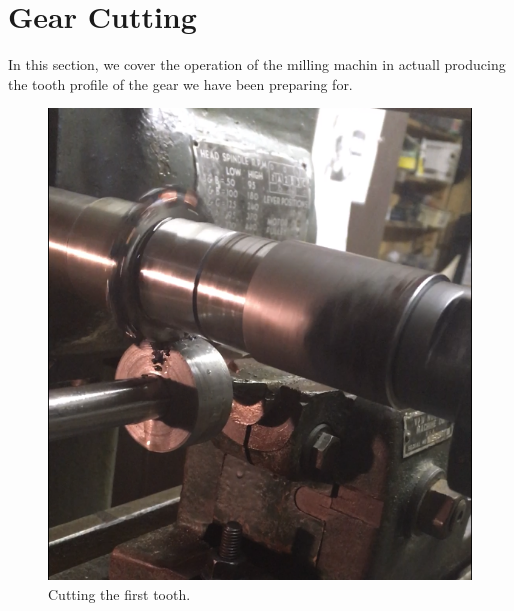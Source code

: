 \documentclass[12pt,twoside,letterpaper]{article}
\begin{document}
\section{Gear Cutting}
In this section, we cover the operation of the milling machin in actuall producing the tooth profile of the gear we have been preparing for. 
\begin{figure}[H]
	\centering
		\includegraphics[width=5in]{firstCut}
	\caption{Cutting the first tooth.}
\end{figure}

\clearpage
\end{document}
